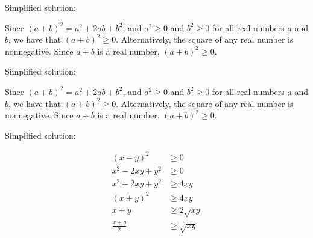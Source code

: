 \documentclass{article}
\begin{document}



Simplified solution:
\begin{tcolorbox}[colback=blue!10, width=\linewidth]
Since $(a+b)^2 = a^2 + 2ab + b^2$, and $a^2 \ge 0$ and $b^2 \ge 0$ for all real numbers $a$ and $b$, we have that $(a+b)^2 \ge 0$. Alternatively, the square of any real number is nonnegative.  Since $a+b$ is a real number, $(a+b)^2 \ge 0$.

\end{tcolorbox}



Simplified solution:
\begin{tcolorbox}[colback=blue!10, width=\linewidth]
Since $(a+b)^2 = a^2 + 2ab + b^2$, and $a^2 \ge 0$ and $b^2 \ge 0$ for all real numbers $a$ and $b$, we have that $(a+b)^2 \ge 0$. Alternatively, the square of any real number is nonnegative.  Since $a+b$ is a real number, $(a+b)^2 \ge 0$.

\end{tcolorbox}



Simplified solution:
\begin{tcolorbox}[colback=blue!10, width=\linewidth]
\begin{align*} (x-y)^2 &\ge 0 \\ x^2 - 2xy + y^2 &\ge 0 \\ x^2 + 2xy + y^2 &\ge 4xy \\ (x+y)^2 &\ge 4xy \\ x+y &\ge 2\sqrt{xy} \\ \frac{x+y}{2} &\ge \sqrt{xy}\end{align*} 

\end{tcolorbox}
\end{document}
